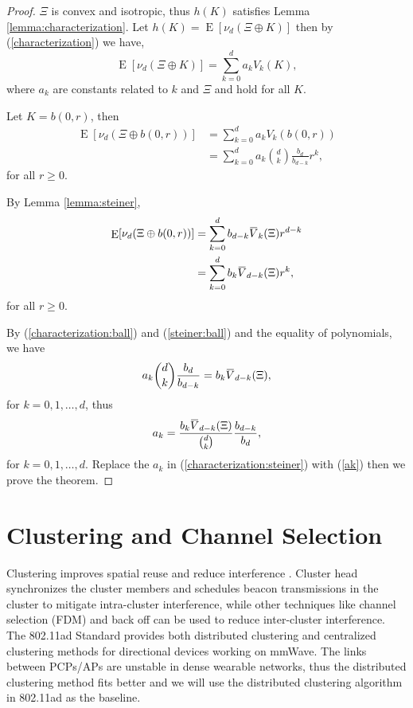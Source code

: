\documentclass[10pt, conference, letterpaper]{IEEEtran}
\DeclareMathOperator*{\E}{\mathrm{E}}
\newcommand{\overbar}[1]{\mkern 1.5mu\overline{\mkern-1.5mu#1\mkern-1.5mu}\mkern 1.5mu}
\begin{document}
\begin{proof}
	$\Xi$ is convex and isotropic, thus $h(K)$ satisfies Lemma \ref{lemma:characterization}. Let $h(K) = \E[\nu_d(\Xi \oplus K)]$ then by (\ref{characterization}) we have, 
	\begin{equation}\label{characterization:steiner}
	\E[\nu_d(\Xi\oplus K)] = \sum\limits_{k=0}^{d}a_kV_k(K),
	\end{equation}
	where $a_k$ are constants related to $k$ and $\Xi$ and hold for all $K$. 
	 
	Let $K=b(0, r)$, then 
	\begin{equation}\label{characterization:ball}
	\begin{aligned}
	\E[\nu_d(\Xi\oplus b(0,r))] &= \sum\limits_{k=0}^{d}a_kV_k(b(0,r))\\
	& = \sum\limits_{k=0}^{d} a_k{d \choose k}\frac{b_d}{b_{d-k}}r^k,
	\end{aligned}
	\end{equation}
	for all $r\geq 0$.
	
	By Lemma \ref{lemma:steiner}, 
	\begin{equation}\label{steiner:ball}
	\begin{aligned}
	\E[\nu_d(\Xi\oplus b(0,r))] &= \sum\limits_{k=0}^{d}b_{d-k}\overbar{V}_k(\Xi)r^{d-k}\\
	& = \sum\limits_{k=0}^{d}b_k\overbar{V}_{d-k}(\Xi)r^k,
	\end{aligned}
	\end{equation}
	for all $r\geq 0$.
	
	By (\ref{characterization:ball}) and (\ref{steiner:ball}) and the equality of polynomials, we have 
	\begin{equation*}
	 a_k{d \choose k}\frac{b_d}{b_{d-k}} = b_k\overbar{V}_{d-k}(\Xi),
	\end{equation*}
	for $k = 0, 1,\ldots, d$, thus
	\begin{equation}\label{ak}
	a_k = \frac{b_k\overbar{V}_{d-k}(\Xi)}{{d\choose k}}\frac{b_{d-k}}{b_d},
	\end{equation}
	for $k = 0, 1,\ldots, d$. Replace the $a_k$ in (\ref{characterization:steiner}) with (\ref{ak}) then we prove the theorem.
\end{proof}


\section{Clustering and Channel Selection}
Clustering improves spatial reuse and reduce interference \cite{80211ad}. Cluster head synchronizes the cluster members and schedules beacon transmissions in the cluster to mitigate intra-cluster interference, while other techniques like channel selection (FDM) and back off \cite{backoff} can be used to reduce inter-cluster interference. The 802.11ad Standard provides both distributed clustering and centralized clustering methods for directional devices working on mmWave. The links between PCPs/APs are unstable in dense wearable networks, thus the distributed clustering method fits better and we will use the distributed clustering algorithm in 802.11ad as the baseline.
\end{document}
